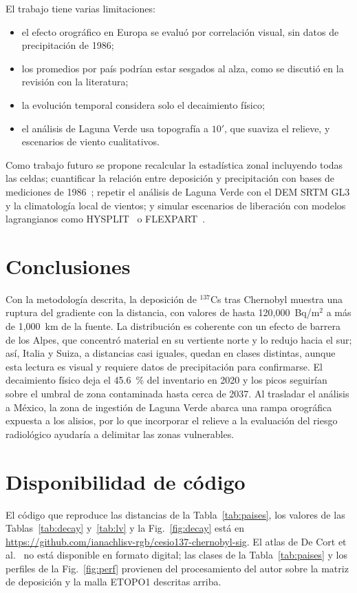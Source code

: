 El trabajo tiene varias limitaciones:
\begin{itemize}
\item el efecto orogr\'afico en Europa se evalu\'o por correlaci\'on visual, sin datos de precipitaci\'on de 1986;
\item los promedios por pa\'is podr\'ian estar sesgados al alza, como se discuti\'o en la revisi\'on con la literatura;
\item la evoluci\'on temporal considera solo el decaimiento f\'isico;
\item el an\'alisis de Laguna Verde usa topograf\'ia a $10'$, que suaviza el relieve, y escenarios de viento cualitativos.
\end{itemize}
Como trabajo futuro se propone recalcular la estad\'istica zonal incluyendo todas las celdas; cuantificar la relaci\'on entre deposici\'on y precipitaci\'on con bases de mediciones de 1986~\cite{evangeliou2016}; repetir el an\'alisis de Laguna Verde con el DEM SRTM GL3 y la climatolog\'ia local de vientos; y simular escenarios de liberaci\'on con modelos lagrangianos como HYSPLIT~\cite{stein2015} o FLEXPART~\cite{pisso2019}.

\section{Conclusiones}
Con la metodolog\'ia descrita, la deposici\'on de $^{137}$Cs tras Chernobyl muestra una ruptura del gradiente con la distancia, con valores de hasta 120,000~Bq/m$^2$ a m\'as de 1,000~km de la fuente. La distribuci\'on es coherente con un efecto de barrera de los Alpes, que concentr\'o material en su vertiente norte y lo redujo hacia el sur; as\'i, Italia y Suiza, a distancias casi iguales, quedan en clases distintas, aunque esta lectura es visual y requiere datos de precipitaci\'on para confirmarse. El decaimiento f\'isico deja el 45.6~\% del inventario en 2020 y los picos seguir\'ian sobre el umbral de zona contaminada hasta cerca de 2037. Al trasladar el an\'alisis a M\'exico, la zona de ingesti\'on de Laguna Verde abarca una rampa orogr\'afica expuesta a los alisios, por lo que incorporar el relieve a la evaluaci\'on del riesgo radiol\'ogico ayudar\'ia a delimitar las zonas vulnerables.

\section*{Disponibilidad de c\'odigo}
El c\'odigo que reproduce las distancias de la Tabla~\ref{tab:paises}, los valores de las Tablas~\ref{tab:decay} y~\ref{tab:lv} y la Fig.~\ref{fig:decay} est\'a en \url{https://github.com/ianachlisv-rgb/cesio137-chernobyl-sig}. El atlas de De Cort et al.~\cite{decort1998} no est\'a disponible en formato digital; las clases de la Tabla~\ref{tab:paises} y los perfiles de la Fig.~\ref{fig:perf} provienen del procesamiento del autor sobre la matriz de deposici\'on y la malla ETOPO1 descritas arriba.

